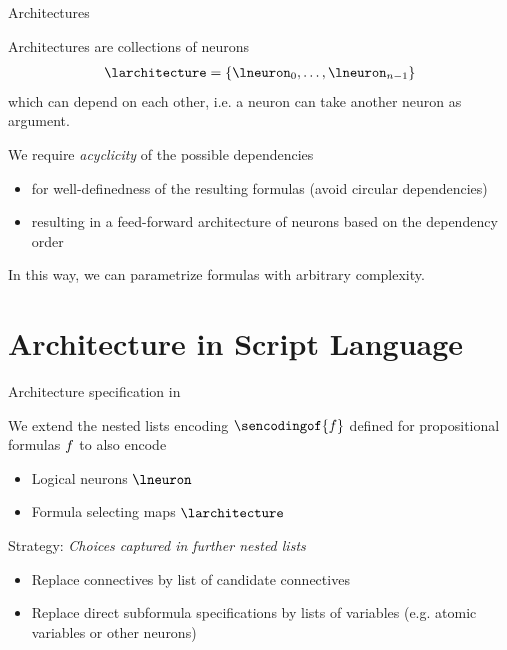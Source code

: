 \documentclass{beamer}
\begin{document}
\begin{frame}{Architectures}

Architectures are collections of neurons 
\begin{align*}
	\larchitecture = \{ \lneuron_0, \ldots , \lneuron_{n-1} \}
\end{align*}
which can depend on each other, i.e. a neuron can take another neuron as argument.

\medskip

We require \emph{acyclicity} of the possible dependencies 
\begin{itemize}
	\item for well-definedness of the resulting formulas (avoid circular dependencies)
	\item resulting in a feed-forward architecture of neurons based on the dependency order
\end{itemize}

\medskip

In this way, we can parametrize formulas with arbitrary complexity.

\end{frame}



\section{Architecture in Script Language}

\begin{frame}{Architecture specification in \tnreason}

We extend the nested lists encoding $\sencodingof{\exformula}$ defined for propositional formulas $f$ to also encode 
\begin{itemize}
	\item Logical neurons $\lneuron$
	\item Formula selecting maps $\larchitecture$
\end{itemize}

Strategy: \emph{Choices captured in further nested lists}
\begin{itemize}
	\item Replace connectives by list of candidate connectives
	\item Replace direct subformula specifications by lists of variables (e.g. atomic variables or other neurons)
\end{itemize}

\end{frame}
\end{document}
